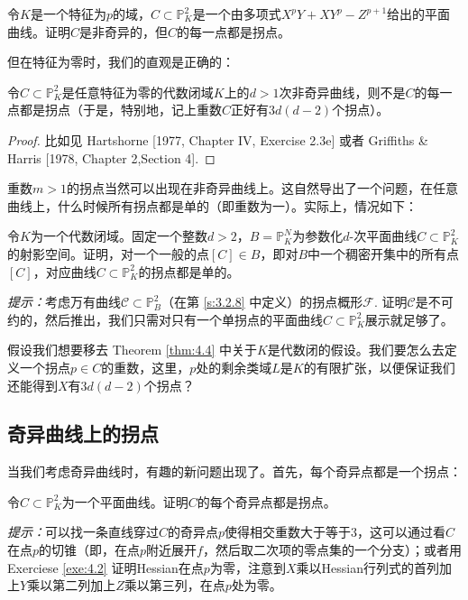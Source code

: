 
\begin{exe}\label{exe:4.3}
	令$K$是一个特征为$p$的域，$C\subset \mathbb P_K^2$是一个由多项式$X^p Y+XY^p-Z^{p+1}$给出的平面曲线。证明$C$是非奇异的，但$C$的每一点都是拐点。
\end{exe}

但在特征为零时，我们的直观是正确的：

\begin{thm}\label{thm:4.4}
	令$C\subset \mathbb P_K^2$是任意特征为零的代数闭域$K$上的$d>1$次非奇异曲线，则不是$C$的每一点都是拐点（于是，特别地，记上重数$C$正好有$3d(d-2)$个拐点）。
\end{thm}

\begin{proof}
	比如见 Hartshorne [1977, Chapter IV, Exercise 2.3e] 或者 Griffiths \& Harris [1978, Chapter 2,Section 4].
\end{proof}

重数$m>1$的拐点当然可以出现在非奇异曲线上。这自然导出了一个问题，在任意曲线上，什么时候所有拐点都是单的（即重数为一）。实际上，情况如下：

\begin{exe}\label{exe:4.5}
	令$K$为一个代数闭域。固定一个整数$d>2$，$B=\mathbb P_K^N$为参数化$d$-次平面曲线$C\subset \mathbb P_K^2$的射影空间。证明，对一个一般的点$[C]\in B$，即对$B$中一个稠密开集中的所有点$[C]$，对应曲线$C\subset \mathbb P_K^2$的拐点都是单的。

	\textit{提示：}考虑万有曲线$\mathscr C\subset \mathbb P_B^2$（在第 \ref{s:3.2.8} 中定义）的拐点概形$\mathscr F$. 证明$\mathscr C$是不可约的，然后推出，我们只需对只有一个单拐点的平面曲线$C\subset \mathbb P_K^2$展示就足够了。\nottran
\end{exe}

\begin{exe}\label{exe:4.6}
	假设我们想要移去 Theorem \ref{thm:4.4} 中关于$K$是代数闭的假设。我们要怎么去定义一个拐点$p\in C$的重数，这里，$p$处的剩余类域$L$是$K$的有限扩张，以便保证我们还能得到$X$有$3d(d-2)$个拐点？
\end{exe}

\subsection{奇异曲线上的拐点}\label{s:4.1.2}

当我们考虑奇异曲线时，有趣的新问题出现了。首先，每个奇异点都是一个拐点：
\begin{exe}\label{exe:4.7}
	令$C\subset \mathbb P_K^2$为一个平面曲线。证明$C$的每个奇异点都是拐点。

	\textit{提示：}可以找一条直线穿过$C$的奇异点$p$使得相交重数大于等于$3$，这可以通过看$C$在点$p$的切锥（即，在点$p$附近展开$f$，然后取二次项的零点集的一个分支）；或者用 Exerciese \ref{exe:4.2} 证明Hessian在点$p$为零，注意到$X$乘以Hessian行列式的首列加上$Y$乘以第二列加上$Z$乘以第三列，在点$p$处为零。
\end{exe}

